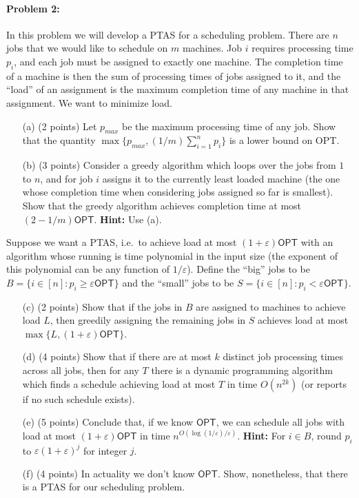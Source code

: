 \documentclass[12pt]{article}
\begin{document}
\paragraph{Problem 2:} In this problem we will develop a PTAS for a scheduling problem. There are $n$ jobs that we would like to schedule on $m$ machines. Job $i$ requires processing time $p_i$, and each job must be assigned to exactly one machine. The completion time of a machine is then the sum of processing times of jobs assigned to it, and the ``load'' of an assignment is the maximum completion time of any machine in that assignment. We want to minimize load.
\begin{itemize}
\item[(a)] (2 points) Let $p_{max}$ be the maximum processing time of any job. Show that the quantity $\max\{p_{max}, (1/m)\sum_{i=1}^n p_i\}$ is a lower bound on \textsf{OPT}.
\item[(b)] (3 points) Consider a greedy algorithm which loops over the jobs from $1$ to $n$, and for job $i$ assigns it to the currently least loaded machine (the one whose completion time when considering jobs assigned so far is smallest). Show that the greedy algorithm achieves completion time at most $(2-1/m)\textsf{OPT}$. \textbf{Hint:} Use (a).
\end{itemize}
Suppose we want a PTAS, i.e.\ to achieve load at most $(1+\varepsilon)\textsf{OPT}$ with an algorithm whose running is time polynomial in the input size (the exponent of this polynomial can be any function of $1/\varepsilon$). Define the ``big'' jobs to be $B = \{i \in [n] : p_i \ge \varepsilon \textsf{OPT}\}$ and the ``small'' jobs to be $S = \{ i \in [n] : p_i < \varepsilon\textsf{OPT}\}$.
\begin{itemize}
\item[(c)] (2 points) Show that if the jobs in $B$ are assigned to machines to achieve load $L$, then greedily assigning the remaining jobs in $S$ achieves load at most $\max\{L, (1+\varepsilon)\textsf{OPT}\}$.
\item[(d)] (4 points) Show that if there are at most $k$ distinct job processing times across all jobs, then for any $T$ there is a dynamic programming algorithm which finds a schedule achieving load at most $T$ in time $O(n^{2k})$ (or reports if no such schedule exists).
\item[(e)] (5 points) Conclude that, if we know $\textsf{OPT}$, we can schedule all jobs with load at most $(1+\varepsilon)\textsf{OPT}$ in time $n^{O(\log(1/\varepsilon)/\varepsilon)}$. \textbf{Hint:}  For $i\in B$, round $p_i$ to $\varepsilon(1+\varepsilon)^j$ for integer $j$.
\item[(f)] (4 points) In actuality we don't know $\textsf{OPT}$. Show, nonetheless, that there is a PTAS for our scheduling problem.
\end{itemize}
\end{document}
